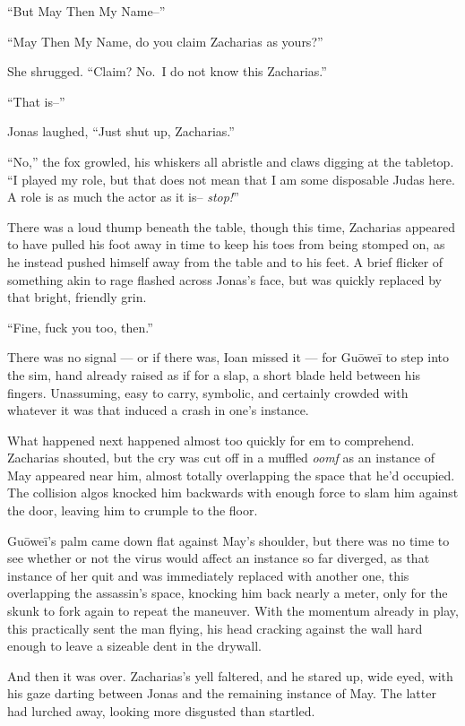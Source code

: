 ``But May Then My Name--''

``May Then My Name, do you claim Zacharias as yours?''

She shrugged. ``Claim? No.~I do not know this Zacharias.''

``That is--''

Jonas laughed, ``Just shut up, Zacharias.''

``No,'' the fox growled, his whiskers all abristle and claws digging at the tabletop. ``I played my role, but that does not mean that I am some disposable Judas here. A role is as much the actor as it is-- \emph{stop!}''

There was a loud thump beneath the table, though this time, Zacharias appeared to have pulled his foot away in time to keep his toes from being stomped on, as he instead pushed himself away from the table and to his feet. A brief flicker of something akin to rage flashed across Jonas's face, but was quickly replaced by that bright, friendly grin.

``Fine, fuck you too, then.''

There was no signal — or if there was, Ioan missed it — for Guōweī to step into the sim, hand already raised as if for a slap, a short blade held between his fingers. Unassuming, easy to carry, symbolic, and certainly crowded with whatever it was that induced a crash in one's instance.

What happened next happened almost too quickly for em to comprehend. Zacharias shouted, but the cry was cut off in a muffled \emph{oomf} as an instance of May appeared near him, almost totally overlapping the space that he'd occupied. The collision algos knocked him backwards with enough force to slam him against the door, leaving him to crumple to the floor.

Guōweī's palm came down flat against May's shoulder, but there was no time to see whether or not the virus would affect an instance so far diverged, as that instance of her quit and was immediately replaced with another one, this overlapping the assassin's space, knocking him back nearly a meter, only for the skunk to fork again to repeat the maneuver. With the momentum already in play, this practically sent the man flying, his head cracking against the wall hard enough to leave a sizeable dent in the drywall.

And then it was over. Zacharias's yell faltered, and he stared up, wide eyed, with his gaze darting between Jonas and the remaining instance of May. The latter had lurched away, looking more disgusted than startled.

